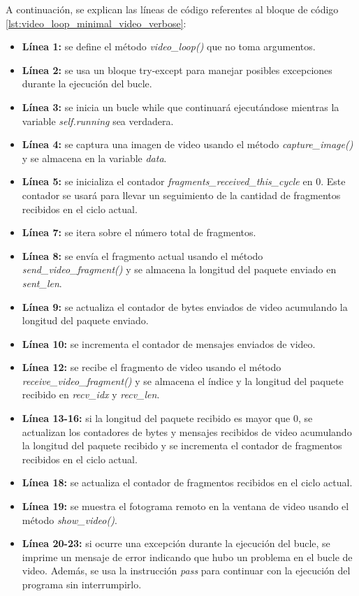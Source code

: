 A continuación, se explican las líneas de código referentes al bloque de código \ref{lst:video_loop_minimal_video_verbose}:
\begin{itemize}
    \item \textbf{Línea 1:} se define el método \textit{video\_loop()} que no toma argumentos.
    \item \textbf{Línea 2:} se usa un bloque try-except para manejar posibles excepciones durante la ejecución del bucle.
    \item \textbf{Línea 3:} se inicia un bucle while que continuará ejecutándose mientras la variable \textit{self.running} sea verdadera.
    \item \textbf{Línea 4:} se captura una imagen de video usando el método \textit{capture\_image()} y se almacena en la variable \textit{data}.
    \item \textbf{Línea 5:} se inicializa el contador \textit{fragments\_received\_this\_cycle} en 0. Este contador se usará para llevar un seguimiento de la cantidad de fragmentos recibidos en el ciclo actual.
    \item \textbf{Línea 7:} se itera sobre el número total de fragmentos.
    \item \textbf{Línea 8:} se envía el fragmento actual usando el método \textit{send\_video\_fragment()} y se almacena la longitud del paquete enviado en \textit{sent\_len}.
    \item \textbf{Línea 9:} se actualiza el contador de bytes enviados de video acumulando la longitud del paquete enviado.
    \item \textbf{Línea 10:} se incrementa el contador de mensajes enviados de video.
    \item \textbf{Línea 12:} se recibe el fragmento de video usando el método \textit{receive\_video\_fragment()} y se almacena el índice y la longitud del paquete recibido en \textit{recv\_idx} y \textit{recv\_len}.
    \item \textbf{Línea 13-16:} si la longitud del paquete recibido es mayor que 0, se actualizan los contadores de bytes y mensajes recibidos de video acumulando la longitud del paquete recibido y se incrementa el contador de fragmentos recibidos en el ciclo actual.
    \item \textbf{Línea 18:} se actualiza el contador de fragmentos recibidos en el ciclo actual.
    \item \textbf{Línea 19:} se muestra el fotograma remoto en la ventana de video usando el método \textit{show\_video()}.
    \item \textbf{Línea 20-23:} si ocurre una excepción durante la ejecución del bucle, se imprime un mensaje de error indicando que hubo un problema en el bucle de video. Además, se usa la instrucción \textit{pass} para continuar con la ejecución del programa sin interrumpirlo. 
\end{itemize}
\vspace{\baselineskip}

